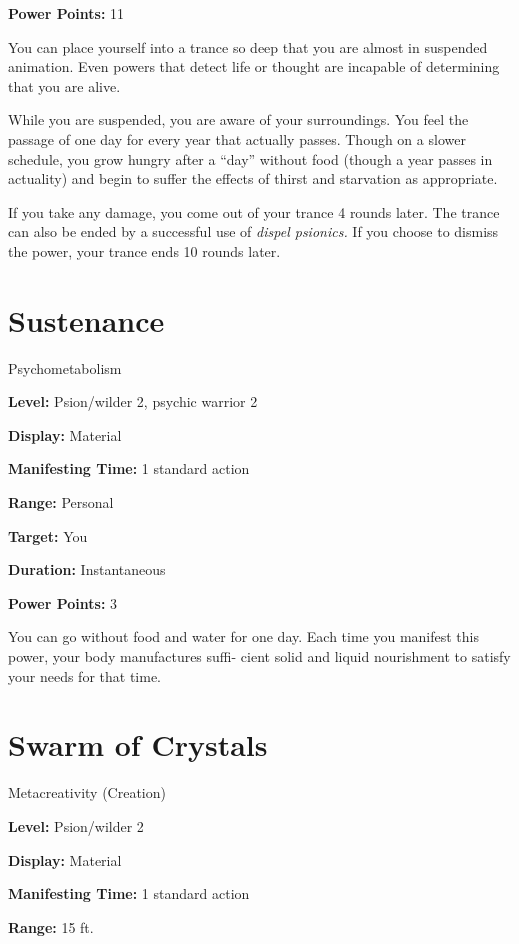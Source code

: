 \documentclass{article}
\begin{document}
\textbf{Power Points:} 11

You can place yourself into a trance so deep that you are almost in suspended animation. 
Even powers that detect life or thought are incapable of determining that you are 
alive.

While you are suspended, you are aware of your surroundings. You feel the passage 
of one day for every year that actually passes. Though on a slower schedule, you 
grow hungry after a ``day'' without food (though a year passes in actuality) and 
begin to suffer the effects of thirst and starvation as appropriate.

If you take any damage, you come out of your trance 4 rounds later. The trance 
can also be ended by a successful use of \textit{dispel psionics. }If you choose 
to dismiss the power, your trance ends 10 rounds later.

\vspace{12pt}
\section*{Sustenance}

Psychometabolism

\textbf{Level:} Psion/wilder 2, psychic warrior 2

\textbf{Display:} Material

\textbf{Manifesting Time:} 1 standard action

\textbf{Range:} Personal

\textbf{Target:} You

\textbf{Duration:} Instantaneous

\textbf{Power Points:} 3

You can go without food and water for one day. Each time you manifest this power, 
your body manufactures suffi- cient solid and liquid nourishment to satisfy your 
needs for that time.

\vspace{12pt}
\section*{Swarm of Crystals}

Metacreativity (Creation)

\textbf{Level:} Psion/wilder 2

\textbf{Display:} Material

\textbf{Manifesting Time:} 1 standard action

\textbf{Range:} 15 ft.
\end{document}
